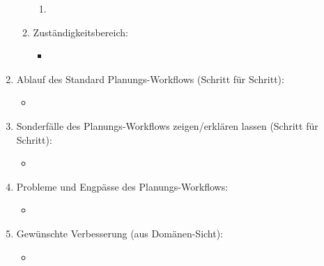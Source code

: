\documentclass[Bachelorarbeit.tex]{subfiles}
\begin{document}
\begin{enumerate}
\begin{enumerate}
\begin{enumerate}
			\item[] 
		\end{enumerate}
		\item Zuständigkeitsbereich:
		\begin{itemize}
			\item[] 
		\end{itemize}
	\end{enumerate}
	\item Ablauf des Standard Planungs-Workflows (Schritt für Schritt):
	\begin{itemize}
		\item[] 
	\end{itemize}
	\item Sonderfälle des Planungs-Workflows zeigen/erklären lassen (Schritt für Schritt):
	\begin{itemize}
		\item[] 
	\end{itemize}
	\item Probleme und Engpässe des Planungs-Workflows:
	\begin{itemize}
		\item[] 
	\end{itemize}
	\item Gewünschte Verbesserung (aus Domänen-Sicht):
	\begin{itemize}
		\item[] 
	\end{itemize}
\end{enumerate}
\end{document}
